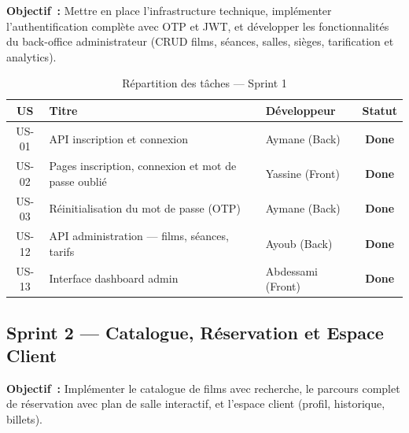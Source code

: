 \documentclass[12pt]{report}
\begin{document}
\textbf{Objectif~:} Mettre en place l'infrastructure technique,
implémenter l'authentification complète avec OTP et JWT,
et développer les fonctionnalités du back-office
administrateur (CRUD films, séances, salles, sièges,
tarification et analytics).
 
\begin{table}[H]
\centering
\renewcommand{\arraystretch}{1.4}
\begin{tabular}{|c|p{4cm}|l|c|}
\hline
\rowcolor{gray!20}
\textbf{US} & \textbf{Titre} & \textbf{Développeur} & \textbf{Statut} \\
\hline
US-01 & API inscription et connexion & Aymane (Back) &
\textcolor{green!60!black}{\textbf{Done}} \\
\hline
US-02 & Pages inscription, connexion et mot de passe oublié & Yassine (Front) &
\textcolor{green!60!black}{\textbf{Done}} \\
\hline
US-03 & Réinitialisation du mot de passe (OTP) & Aymane (Back) &
\textcolor{green!60!black}{\textbf{Done}} \\
\hline
US-12 & API administration — films, séances, tarifs & Ayoub (Back) &
\textcolor{green!60!black}{\textbf{Done}} \\
\hline
US-13 & Interface dashboard admin & Abdessami (Front) &
\textcolor{green!60!black}{\textbf{Done}} \\
\hline
\end{tabular}
\caption{Répartition des tâches — Sprint 1}
\label{tab:sprint1}
\end{table}
 
\subsection{Sprint 2 — Catalogue, Réservation et Espace Client}
 
\textbf{Objectif~:} Implémenter le catalogue de films avec
recherche, le parcours complet de réservation avec plan de
salle interactif, et l'espace client (profil, historique,
billets).
 
\end{document}
